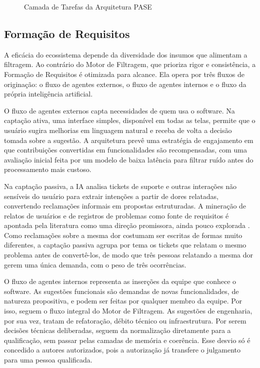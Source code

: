 \begin{figure}[htb]
\centering
\caption{Camada de Tarefas da Arquitetura PASE}
\label{fig:3}
\end{figure}

\subsection{Formação de Requisitos}\label{sec:4.3.1}

A eficácia do ecossistema depende da diversidade dos insumos que alimentam a filtragem. Ao contrário do Motor de Filtragem, que prioriza rigor e consistência, a Formação de Requisitos é otimizada para alcance. Ela opera por três fluxos de originação: o fluxo de agentes externos, o fluxo de agentes internos e o fluxo da própria inteligência artificial.

O fluxo de agentes externos capta necessidades de quem usa o software. Na captação ativa, uma interface simples, disponível em todas as telas, permite que o usuário sugira melhorias em linguagem natural e receba de volta a decisão tomada sobre a sugestão. A arquitetura prevê uma estratégia de engajamento em que contribuições convertidas em funcionalidades são recompensadas, com uma avaliação inicial feita por um modelo de baixa latência para filtrar ruído antes do processamento mais custoso.

Na captação passiva, a IA analisa tickets de suporte e outras interações não sensíveis do usuário para extrair intenções a partir de dores relatadas, convertendo reclamações informais em propostas estruturadas. A mineração de relatos de usuários e de registros de problemas como fonte de requisitos é apontada pela literatura como uma direção promissora, ainda pouco explorada \cite{hou2024llm4se,zhang2026survey}. Como reclamações sobre a mesma dor costumam ser escritas de formas muito diferentes, a captação passiva agrupa por tema os tickets que relatam o mesmo problema antes de convertê-los, de modo que três pessoas relatando a mesma dor gerem uma única demanda, com o peso de três ocorrências.

O fluxo de agentes internos representa as inserções da equipe que conhece o software. As sugestões funcionais são demandas de novas funcionalidades, de natureza propositiva, e podem ser feitas por qualquer membro da equipe. Por isso, seguem o fluxo integral do Motor de Filtragem. As sugestões de engenharia, por sua vez, tratam de refatoração, débito técnico ou infraestrutura. Por serem decisões técnicas deliberadas, seguem da normalização diretamente para a qualificação, sem passar pelas camadas de memória e coerência. Esse desvio só é concedido a autores autorizados, pois a autorização já transfere o julgamento para uma pessoa qualificada.

